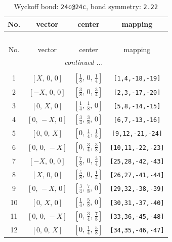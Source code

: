 \documentclass[fleqn,8pt]{jsarticle}
\begin{document}
\renewcommand{\arraystretch}{1.2}
\begin{longtable}{cccc}
\caption{Wyckoff bond: {\tt 24c@24c}, bond symmetry: {\tt 2.22}}
 \\
 \hline \hline
No. & vector & center & mapping \\ \hline \endfirsthead

\multicolumn{3}{l}{\tablename\ \thetable{}} \\
 \hline \hline
No. & vector & center & mapping \\ \hline \endhead

 \hline \hline
\multicolumn{3}{r}{\footnotesize\it continued ...} \\ \endfoot

 \hline \hline
\multicolumn{3}{r}{} \\ \endlastfoot

1 & $\left[ X,\, 0,\, 0 \right]$ & $\left[ \frac{1}{8},\, 0,\, \frac{1}{4} \right]$ & {\tt [1,4,-18,-19]} \\ \hline
2 & $\left[ - X,\, 0,\, 0 \right]$ & $\left[ \frac{3}{8},\, 0,\, \frac{3}{4} \right]$ & {\tt [2,3,-17,-20]} \\ \hline
3 & $\left[ 0,\, X,\, 0 \right]$ & $\left[ \frac{1}{4},\, \frac{1}{8},\, 0 \right]$ & {\tt [5,8,-14,-15]} \\ \hline
4 & $\left[ 0,\, - X,\, 0 \right]$ & $\left[ \frac{3}{4},\, \frac{3}{8},\, 0 \right]$ & {\tt [6,7,-13,-16]} \\ \hline
5 & $\left[ 0,\, 0,\, X \right]$ & $\left[ 0,\, \frac{1}{4},\, \frac{1}{8} \right]$ & {\tt [9,12,-21,-24]} \\ \hline
6 & $\left[ 0,\, 0,\, - X \right]$ & $\left[ 0,\, \frac{3}{4},\, \frac{3}{8} \right]$ & {\tt [10,11,-22,-23]} \\ \hline
7 & $\left[ - X,\, 0,\, 0 \right]$ & $\left[ \frac{7}{8},\, 0,\, \frac{3}{4} \right]$ & {\tt [25,28,-42,-43]} \\ \hline
8 & $\left[ X,\, 0,\, 0 \right]$ & $\left[ \frac{5}{8},\, 0,\, \frac{1}{4} \right]$ & {\tt [26,27,-41,-44]} \\ \hline
9 & $\left[ 0,\, - X,\, 0 \right]$ & $\left[ \frac{3}{4},\, \frac{7}{8},\, 0 \right]$ & {\tt [29,32,-38,-39]} \\ \hline
10 & $\left[ 0,\, X,\, 0 \right]$ & $\left[ \frac{1}{4},\, \frac{5}{8},\, 0 \right]$ & {\tt [30,31,-37,-40]} \\ \hline
11 & $\left[ 0,\, 0,\, - X \right]$ & $\left[ 0,\, \frac{3}{4},\, \frac{7}{8} \right]$ & {\tt [33,36,-45,-48]} \\ \hline
12 & $\left[ 0,\, 0,\, X \right]$ & $\left[ 0,\, \frac{1}{4},\, \frac{5}{8} \right]$ & {\tt [34,35,-46,-47]} \\
\end{longtable}
\end{document}
